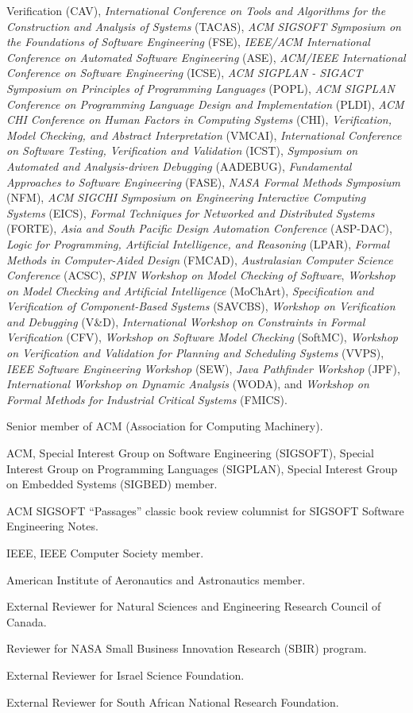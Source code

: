 \documentclass[ComputerScience]{vita}
\begin{document}
\begin{vita}
\begin{Professional Activities and Service}
{  Verification} (CAV), \emph{International Conference on Tools and Algorithms for the Construction and Analysis of Systems} (TACAS), \emph{ACM SIGSOFT Symposium on the Foundations of Software Engineering} (FSE), \emph{IEEE/ACM International Conference on Automated Software Engineering} (ASE), \emph{ACM/IEEE International Conference on Software Engineering} (ICSE), \emph{ACM SIGPLAN - SIGACT Symposium on Principles of Programming Languages} (POPL), \emph{ACM SIGPLAN Conference on Programming Language Design and Implementation} (PLDI), \emph{ACM CHI Conference on Human Factors in Computing Systems} (CHI), \emph{Verification, Model Checking, and Abstract Interpretation} (VMCAI), \emph{International Conference on Software Testing, Verification and Validation} (ICST), \emph{Symposium on Automated and Analysis-driven Debugging} (AADEBUG), \emph{Fundamental Approaches to Software Engineering} (FASE), \emph{NASA Formal Methods Symposium} (NFM), \emph{ACM SIGCHI Symposium on Engineering Interactive Computing Systems} (EICS), \emph{Formal Techniques for Networked and Distributed Systems} (FORTE), \emph{Asia and South Pacific Design Automation Conference} (ASP-DAC), \emph{Logic for Programming, Artificial Intelligence, and Reasoning} (LPAR), \emph{Formal Methods in Computer-Aided Design} (FMCAD), \emph{Australasian Computer Science Conference} (ACSC), \emph{SPIN Workshop on Model Checking of Software}, \emph{Workshop on Model Checking and Artificial Intelligence} (MoChArt), \emph{Specification and Verification of Component-Based Systems} (SAVCBS), \emph{Workshop on Verification and Debugging} (V\&D), \emph{International Workshop on Constraints in Formal Verification} (CFV), \emph{Workshop on Software Model Checking} (SoftMC), \emph{Workshop on Verification and Validation for Planning and Scheduling Systems} (VVPS), \emph{IEEE Software Engineering Workshop} (SEW), \emph{Java Pathfinder Workshop} (JPF), \emph{International Workshop on Dynamic Analysis} (WODA), and \emph{Workshop on Formal Methods for Industrial Critical Systems} (FMICS).
\item Senior member of ACM (Association for Computing Machinery).
  \item ACM, Special Interest Group on Software Engineering (SIGSOFT),
    Special Interest Group on Programming Languages (SIGPLAN), Special
    Interest Group on Embedded Systems (SIGBED) member.
\item ACM SIGSOFT ``Passages'' classic book review columnist for SIGSOFT Software Engineering Notes.
\item IEEE, IEEE Computer Society member.
\item American Institute of Aeronautics and Astronautics member.
\item External Reviewer for Natural Sciences and Engineering Research Council of Canada.
\item Reviewer for NASA Small Business Innovation Research (SBIR) program.
\item External Reviewer for Israel Science Foundation.
\item External Reviewer for South African National Research Foundation.
\end{Professional Activities and Service}


\end{vita}
\end{document}
